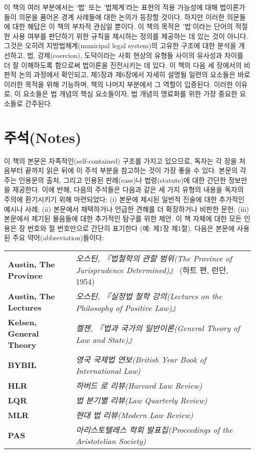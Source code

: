 \documentclass[12pt, oneside]{book}  %
\begin{document}
이 책의 여러 부분에서는 `법' 또는 '법체계'라는 표현의 적용 가능성에 대해
법이론가들이 의문을 품어온 경계 사례들에 대한 논의가 등장할 것이다.
하지만 이러한 의문들에 대한 해답은 이 책의 부차적 관심일 뿐이다. 이 책의
목적은 '법'이라는 단어의 적절한 사용 여부를 판단하기 위한 규칙을
제시하는 정의를 제공하는 데 있는 것이 아니다. 그것은 오히려
지방법체계(municipal legal system)의 고유한 구조에 대한 분석을 개선하고,
법, 강제(coercion), 도덕이라는 사회 현상의 유형들 사이의 유사성과 차이를
더 잘 이해하도록 함으로써 법이론을 진전시키는 데 있다. 이 책의 다음 세
장에서의 비판적 논의 과정에서 확인되고, 제5장과 제6장에서 자세히 설명될
일련의 요소들은 바로 이러한 목적을 위해 기능하며, 책의 나머지 부분에서
그 역할이 입증된다. 이러한 이유로, 이 요소들은 법 개념의 핵심
요소들이자, 법 개념의 명료화를 위한 가장 중요한 요소들로 간주된다.

\newpage

\section{주석(Notes)}\label{uxc8fcuxc11dnotes}

이 책의 본문은 자족적인(self-contained) 구조를 가지고 있으므로, 독자는
각 장을 처음부터 끝까지 읽은 뒤에 이 주석 부분을 참고하는 것이 가장 좋을
수 있다. 본문의 각주는 인용문의 출처, 그리고 인용된 판례(case)나
법령(statute)에 대한 간단한 정보만을 제공한다. 이에 반해, 다음의
주석들은 다음과 같은 세 가지 유형의 내용을 독자의 주의에 환기시키기 위해
마련되었다: (i) 본문에 제시된 일반적 진술에 대한 추가적인 예시나 사례;
(ii) 본문에서 채택하거나 언급한 견해를 더 확장하거나 비판한 문헌; (iii)
본문에서 제기된 물음들에 대한 추가적인 탐구를 위한 제안. 이 책 자체에
대한 모든 인용은 장 번호와 절 번호만으로 간단히 표기한다 (예: 제1장
제1절). 다음은 본문에 사용된 주요 약어(abbreviation)들이다:

\vspace{1em}

\begin{tabular}{@{}l p{10cm}@{}}
\textbf{Austin, The Province}   & \textit{오스틴, 『법철학의 관할 범위(The Province of Jurisprudence Determined)』} (하트 편, 런던, 1954) \\
\textbf{Austin, The Lectures}   & \textit{오스틴, 『실정법 철학 강의(Lectures on the Philosophy of Positive Law)』} \\
\textbf{Kelsen, General Theory} & \textit{켈젠, 『법과 국가의 일반이론(General Theory of Law and State)』} \\
\textbf{BYBIL}                  & \textit{영국 국제법 연보(British Year Book of International Law)} \\
\textbf{HLR}                    & \textit{하버드 로 리뷰(Harvard Law Review)} \\
\textbf{LQR}                    & \textit{법 분기별 리뷰(Law Quarterly Review)} \\
\textbf{MLR}                    & \textit{현대 법 리뷰(Modern Law Review)} \\
\textbf{PAS}                    & \textit{아리스토텔레스 학회 발표집(Proceedings of the Aristotelian Society)} \\
\end{tabular}
\end{document}
